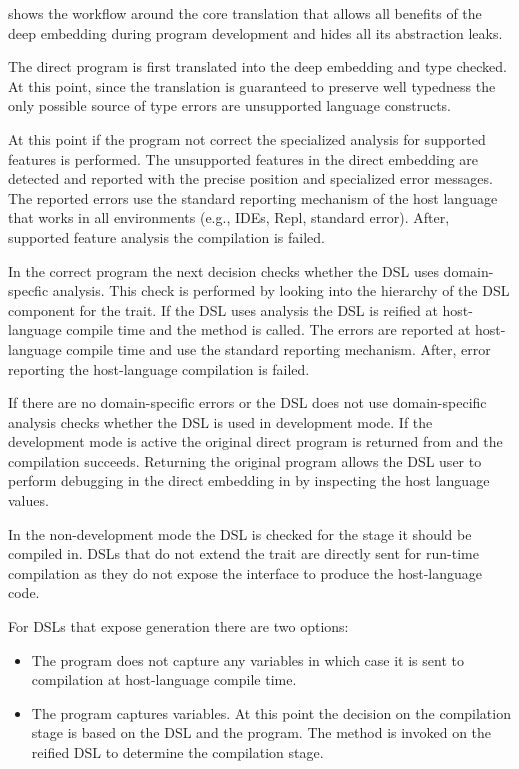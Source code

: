  shows the workflow around the core translation that allows
 all benefits of the deep embedding during program development and hides all its abstraction leaks.

 The direct program is first translated into the deep embedding and type checked. At this point, since the translation
 is guaranteed to preserve well typedness the only possible source of type errors are unsupported language
 constructs.

 At this point if the program not correct the specialized analysis for supported features is performed. The unsupported features
  in the direct embedding are detected and reported with the precise position and specialized error messages. The reported errors
  use the standard reporting mechanism of the host language that works in all environments (e.g., IDEs, Repl, standard error). After,
  supported feature analysis the compilation is failed.

In the correct program the next decision checks whether the DSL uses domain-specfic analysis. This check is performed by looking
 into the hierarchy of the DSL component for the  trait. If the DSL uses analysis
 the DSL is reified at host-language compile time and the  method is called. The errors
 are reported at host-language compile time and use the standard reporting mechanism. After, error reporting
 the host-language compilation is failed.

If there are no domain-specific errors or the DSL does not use domain-specific analysis \yy checks
 whether the DSL is used in development mode. If the development mode is active
 the original direct program is returned from and the compilation succeeds. Returning
 the original program allows the DSL user to perform debugging in the direct embedding in
 by inspecting the host language values.

In the non-development mode the DSL is checked for the stage it should be compiled in. DSLs that
 do not extend the  trait are directly sent for run-time compilation as they
 do not expose the interface to produce the host-language code.

For DSLs that expose generation there are two options: \begin{itemize}
 \item The program does not capture any variables in which case it is sent to compilation at host-language compile time.
 \item The program captures variables. At this point the decision on the compilation stage is based on the DSL and the program. The
   method  is invoked on the reified DSL to determine the compilation stage.
\end{itemize}

